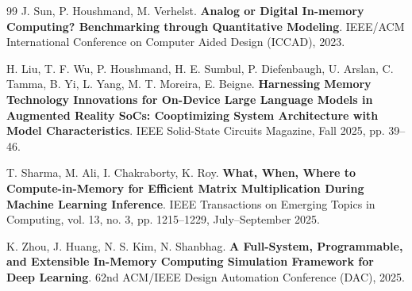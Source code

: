 \documentclass[11pt, a4paper]{ctexart}
\let\emph\textbf
\theoremstyle{definition}
\begin{document}
\begin{thebibliography}{99}
J. Sun, P. Houshmand, M. Verhelst.
\emph{Analog or Digital In-memory Computing? Benchmarking through Quantitative Modeling}.
IEEE/ACM International Conference on Computer Aided Design (ICCAD), 2023.

H. Liu, T. F. Wu, P. Houshmand, H. E. Sumbul, P. Diefenbaugh, U. Arslan, C. Tamma, B. Yi, L. Yang, M. T. Moreira, E. Beigne.
\emph{Harnessing Memory Technology Innovations for On-Device Large Language Models in Augmented Reality SoCs: Cooptimizing System Architecture with Model Characteristics}.
IEEE Solid-State Circuits Magazine, Fall 2025, pp. 39--46.

T. Sharma, M. Ali, I. Chakraborty, K. Roy.
\emph{What, When, Where to Compute-in-Memory for Efficient Matrix Multiplication During Machine Learning Inference}.
IEEE Transactions on Emerging Topics in Computing, vol. 13, no. 3, pp. 1215--1229, July--September 2025.

K. Zhou, J. Huang, N. S. Kim, N. Shanbhag.
\emph{A Full-System, Programmable, and Extensible In-Memory Computing Simulation Framework for Deep Learning}.
62nd ACM/IEEE Design Automation Conference (DAC), 2025.

\end{thebibliography}
\end{document}
